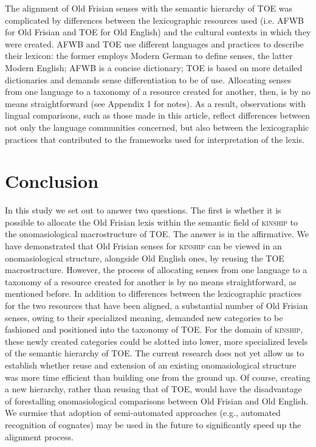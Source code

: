 The alignment of Old Frisian senses with the semantic hierarchy of TOE was complicated by differences between the lexicographic resources used (i.e. AFWB for Old Frisian and TOE for Old English) and the cultural contexts in which they were created. AFWB and TOE use different languages and practices to describe their lexicon: the former employs Modern German to define senses, the latter Modern English; AFWB is a concise dictionary; TOE is based on more detailed dictionaries and demands sense differentiation to be of use. Allocating senses from one language to a taxonomy of a resource created for another, then, is by no means straightforward (see Appendix 1 for notes). As a result, observations with lingual comparisons, such as those made in this article, reflect differences between not only the language communities concerned, but also between the lexicographic practices that contributed to the frameworks used for interpretation of the lexis.

\section{Conclusion}
\label{sect:Stolk2021b:Conclusion}

In this study we set out to answer two questions. The first is whether it is possible to allocate the Old Frisian lexis within the semantic field of \textsc{kinship} to the onomasiological macrostructure of TOE. The answer is in the affirmative. We have demonstrated that Old Frisian senses for \textsc{kinship} can be viewed in an onomasiological structure, alongside Old English ones, by reusing the TOE macrostructure. However, the process of allocating senses from one language to a taxonomy of a resource created for another is by no means straightforward, as mentioned before. In addition to differences between the lexicographic practices for the two resources that have been aligned, a substantial number of Old Frisian senses, owing to their specialized meaning, demanded new categories to be fashioned and positioned into the taxonomy of TOE. For the domain of \textsc{kinship}, these newly created categories could be slotted into lower, more specialized levels of the semantic hierarchy of TOE. The current research does not yet allow us to establish whether reuse and extension of an existing onomasiological structure was more time efficient than building one from the ground up. Of course, creating a new hierarchy, rather than reusing that of TOE, would have the disadvantage of forestalling onomasiological comparisons between Old Frisian and Old English. We surmise that adoption of semi-automated approaches (e.g., automated recognition of cognates) may be used in the future to significantly speed up the alignment process. 

